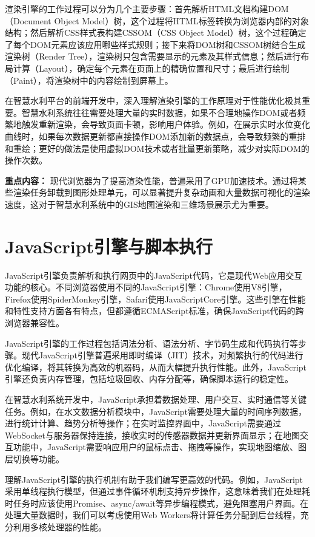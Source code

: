 渲染引擎的工作过程可以分为几个主要步骤：首先解析HTML文档构建DOM（Document Object Model）树，这个过程将HTML标签转换为浏览器内部的对象结构；然后解析CSS样式表构建CSSOM（CSS Object Model）树，这个过程确定了每个DOM元素应该应用哪些样式规则；接下来将DOM树和CSSOM树结合生成渲染树（Render Tree），渲染树只包含需要显示的元素及其样式信息；然后进行布局计算（Layout），确定每个元素在页面上的精确位置和尺寸；最后进行绘制（Paint），将渲染树中的内容绘制到屏幕上。

在智慧水利平台的前端开发中，深入理解渲染引擎的工作原理对于性能优化极其重要。智慧水利系统往往需要处理大量的实时数据，如果不合理地操作DOM或者频繁地触发重新渲染，会导致页面卡顿，影响用户体验。例如，在展示实时水位变化曲线时，如果每次数据更新都直接操作DOM添加新的数据点，会导致频繁的重排和重绘；更好的做法是使用虚拟DOM技术或者批量更新策略，减少对实际DOM的操作次数。

\textbf{重点内容：} 现代浏览器为了提高渲染性能，普遍采用了GPU加速技术。通过将某些渲染任务卸载到图形处理单元，可以显著提升复杂动画和大量数据可视化的渲染速度，这对于智慧水利系统中的GIS地图渲染和三维场景展示尤为重要。

\section{JavaScript引擎与脚本执行}

JavaScript引擎负责解析和执行网页中的JavaScript代码，它是现代Web应用交互功能的核心。不同浏览器使用不同的JavaScript引擎：Chrome使用V8引擎，Firefox使用SpiderMonkey引擎，Safari使用JavaScriptCore引擎。这些引擎在性能和特性支持方面各有特点，但都遵循ECMAScript标准，确保JavaScript代码的跨浏览器兼容性。

JavaScript引擎的工作过程包括词法分析、语法分析、字节码生成和代码执行等步骤。现代JavaScript引擎普遍采用即时编译（JIT）技术，对频繁执行的代码进行优化编译，将其转换为高效的机器码，从而大幅提升执行性能。此外，JavaScript引擎还负责内存管理，包括垃圾回收、内存分配等，确保脚本运行的稳定性。

在智慧水利系统开发中，JavaScript承担着数据处理、用户交互、实时通信等关键任务。例如，在水文数据分析模块中，JavaScript需要处理大量的时间序列数据，进行统计计算、趋势分析等操作；在实时监控界面中，JavaScript需要通过WebSocket与服务器保持连接，接收实时的传感器数据并更新界面显示；在地图交互功能中，JavaScript需要响应用户的鼠标点击、拖拽等操作，实现地图缩放、图层切换等功能。

理解JavaScript引擎的执行机制有助于我们编写更高效的代码。例如，JavaScript采用单线程执行模型，但通过事件循环机制支持异步操作，这意味着我们在处理耗时任务时应该使用Promise、async/await等异步编程模式，避免阻塞用户界面。在处理大量数据时，我们可以考虑使用Web Workers将计算任务分配到后台线程，充分利用多核处理器的性能。

